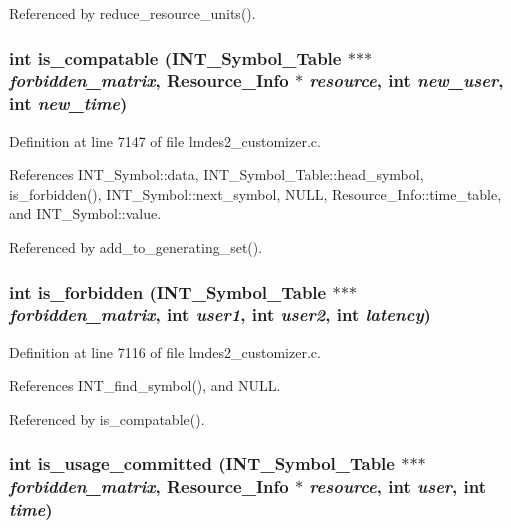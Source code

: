 Referenced by reduce\_\-resource\_\-units().
\subsubsection{\setlength{\rightskip}{0pt plus 5cm}int is\_\-compatable (\bf{INT\_\-Symbol\_\-Table} $\ast$$\ast$$\ast$ {\em forbidden\_\-matrix}, \bf{Resource\_\-Info} $\ast$ {\em resource}, int {\em new\_\-user}, int {\em new\_\-time})}\label{lmdes2__customizer_8c_e57b1f371837875dcd922b96c5d4099d}




Definition at line 7147 of file lmdes2\_\-customizer.c.

References INT\_\-Symbol::data, INT\_\-Symbol\_\-Table::head\_\-symbol, is\_\-forbidden(), INT\_\-Symbol::next\_\-symbol, NULL, Resource\_\-Info::time\_\-table, and INT\_\-Symbol::value.

Referenced by add\_\-to\_\-generating\_\-set().
\subsubsection{\setlength{\rightskip}{0pt plus 5cm}int is\_\-forbidden (\bf{INT\_\-Symbol\_\-Table} $\ast$$\ast$$\ast$ {\em forbidden\_\-matrix}, int {\em user1}, int {\em user2}, int {\em latency})}\label{lmdes2__customizer_8c_ac6b4ad0603ffe89733d6f648fe92f55}




Definition at line 7116 of file lmdes2\_\-customizer.c.

References INT\_\-find\_\-symbol(), and NULL.

Referenced by is\_\-compatable().
\subsubsection{\setlength{\rightskip}{0pt plus 5cm}int is\_\-usage\_\-committed (\bf{INT\_\-Symbol\_\-Table} $\ast$$\ast$$\ast$ {\em forbidden\_\-matrix}, \bf{Resource\_\-Info} $\ast$ {\em resource}, int {\em user}, int {\em time})}\label{lmdes2__customizer_8c_9de3070c3c12a6fffae5eab9c66d1925}





